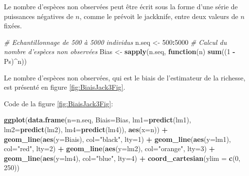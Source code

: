\documentclass[
  11pt,
  french,
  a4paper,
  extrafontsizes,onecolumn,openright
  ]{memoir}
\newenvironment{Shaded}{\begin{snugshade}}{\end{snugshade}}
\newcommand{\CommentTok}[1]{\textcolor[rgb]{0.56,0.35,0.01}{\textit{#1}}}
\newcommand{\ControlFlowTok}[1]{\textcolor[rgb]{0.13,0.29,0.53}{\textbf{#1}}}
\newcommand{\DataTypeTok}[1]{\textcolor[rgb]{0.13,0.29,0.53}{#1}}
\newcommand{\DecValTok}[1]{\textcolor[rgb]{0.00,0.00,0.81}{#1}}
\newcommand{\KeywordTok}[1]{\textcolor[rgb]{0.13,0.29,0.53}{\textbf{#1}}}
\newcommand{\NormalTok}[1]{#1}
\newcommand{\OperatorTok}[1]{\textcolor[rgb]{0.81,0.36,0.00}{\textbf{#1}}}
\newcommand{\StringTok}[1]{\textcolor[rgb]{0.31,0.60,0.02}{#1}}
\begin{document}
\normalsize

Le nombre d'espèces non observées peut être écrit sous la forme d'une série de puissances négatives de \(n\), comme le prévoit le jackknife, entre deux valeurs de \(n\) fixées.

\scriptsize

\begin{Shaded}
\begin{Highlighting}[]
\CommentTok{# Echantillonnage de 500 à 5000 individus}
\NormalTok{n.seq <-}\StringTok{ }\DecValTok{500}\OperatorTok{:}\DecValTok{5000}
\CommentTok{# Calcul du nombre d'espèces non observées}
\NormalTok{Bias <-}\StringTok{ }\KeywordTok{sapply}\NormalTok{(n.seq, }\ControlFlowTok{function}\NormalTok{(n) }\KeywordTok{sum}\NormalTok{((}\DecValTok{1} \OperatorTok{-}\StringTok{ }\NormalTok{Ps)}\OperatorTok{^}\NormalTok{n))}
\end{Highlighting}
\end{Shaded}

\normalsize

Le nombre d'espèces non observées, qui est le biais de l'estimateur de la richesse, est présenté en figure \ref{fig:BiaisJack3Fig}.

Code de la figure \ref{fig:BiaisJack3Fig}:

\scriptsize

\begin{Shaded}
\begin{Highlighting}[]
\KeywordTok{ggplot}\NormalTok{(}\KeywordTok{data.frame}\NormalTok{(}\DataTypeTok{n=}\NormalTok{n.seq, }\DataTypeTok{Biais=}\NormalTok{Bias, }\DataTypeTok{lm1=}\KeywordTok{predict}\NormalTok{(lm1), }
        \DataTypeTok{lm2=}\KeywordTok{predict}\NormalTok{(lm2), }\DataTypeTok{lm4=}\KeywordTok{predict}\NormalTok{(lm4)), }\KeywordTok{aes}\NormalTok{(}\DataTypeTok{x=}\NormalTok{n)) }\OperatorTok{+}
\StringTok{  }\KeywordTok{geom_line}\NormalTok{(}\KeywordTok{aes}\NormalTok{(}\DataTypeTok{y=}\NormalTok{Biais), }\DataTypeTok{col=}\StringTok{"black"}\NormalTok{, }\DataTypeTok{lty=}\DecValTok{1}\NormalTok{) }\OperatorTok{+}
\StringTok{  }\KeywordTok{geom_line}\NormalTok{(}\KeywordTok{aes}\NormalTok{(}\DataTypeTok{y=}\NormalTok{lm1), }\DataTypeTok{col=}\StringTok{"red"}\NormalTok{, }\DataTypeTok{lty=}\DecValTok{2}\NormalTok{) }\OperatorTok{+}
\StringTok{  }\KeywordTok{geom_line}\NormalTok{(}\KeywordTok{aes}\NormalTok{(}\DataTypeTok{y=}\NormalTok{lm2), }\DataTypeTok{col=}\StringTok{"orange"}\NormalTok{, }\DataTypeTok{lty=}\DecValTok{3}\NormalTok{) }\OperatorTok{+}
\StringTok{  }\KeywordTok{geom_line}\NormalTok{(}\KeywordTok{aes}\NormalTok{(}\DataTypeTok{y=}\NormalTok{lm4), }\DataTypeTok{col=}\StringTok{"blue"}\NormalTok{, }\DataTypeTok{lty=}\DecValTok{4}\NormalTok{) }\OperatorTok{+}
\StringTok{  }\KeywordTok{coord_cartesian}\NormalTok{(}\DataTypeTok{ylim =} \KeywordTok{c}\NormalTok{(}\DecValTok{0}\NormalTok{, }\DecValTok{250}\NormalTok{))}
\end{Highlighting}
\end{Shaded}
\end{document}
